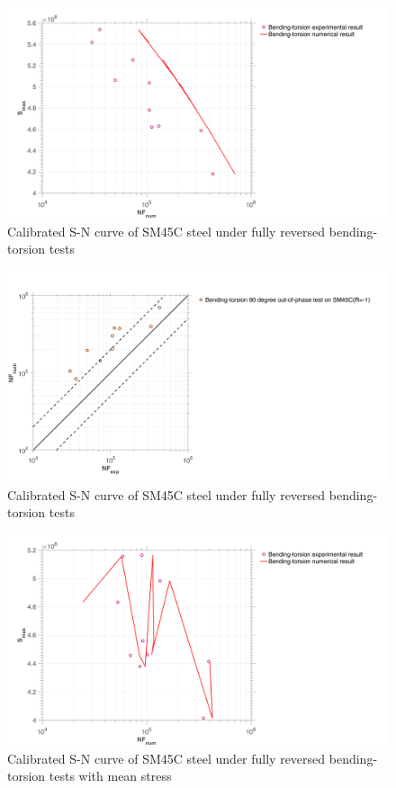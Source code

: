 \documentclass[3p,times,number,review]{elsarticle}
\begin{document}
\begin{figure}[!h]
	\centering
	\includegraphics[width=\textwidth]{figures//bt2D_SM45C_sn.png} 
	\caption{Calibrated S-N curve of SM45C steel under fully reversed bending-torsion tests}
	\label{fig.bt2DSM45Csn}
\end{figure}
\begin{figure}[!h]
	\centering
	\includegraphics[width=\textwidth]{figures//bt2D_SM45C_err1.png} 
	\caption{Calibrated S-N curve of SM45C steel under fully reversed bending-torsion tests}
	\label{fig.bt2DSM45Cerr1}
\end{figure}
\begin{figure}[!h]
	\centering
	\includegraphics[width=\textwidth]{figures//bt2D_m_SM45C_sn.png} 
	\caption{Calibrated S-N curve of SM45C steel under fully reversed bending-torsion tests with mean stress}
	\label{fig.bt2DmSM45Csn}
\end{figure}
\end{document}

